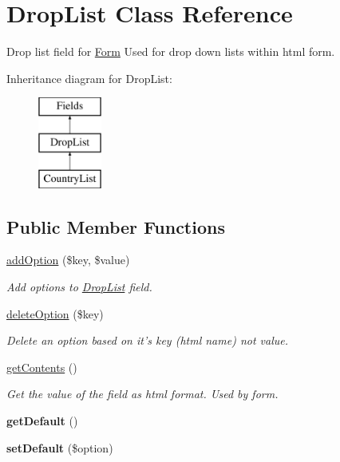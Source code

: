 \hypertarget{class_drop_list}{\section{Drop\-List Class Reference}
\label{class_drop_list}
}


Drop list field for \hyperlink{class_form}{Form} Used for drop down lists within html form.  


Inheritance diagram for Drop\-List\-:\begin{figure}[H]
\begin{center}
\leavevmode
\includegraphics[height=3.000000cm]{class_drop_list}
\end{center}
\end{figure}
\subsection*{Public Member Functions}
\begin{DoxyCompactItemize}
\item 
\hyperlink{class_drop_list_ae820b56637ba8a8d0c4de37d4313231a}{add\-Option} (\$key, \$value)
\begin{DoxyCompactList}\small\item\em Add options to \hyperlink{class_drop_list}{Drop\-List} field. \end{DoxyCompactList}\item 
\hypertarget{class_drop_list_a3c65f396966df9520cc32aceecdac142}{\hyperlink{class_drop_list_a3c65f396966df9520cc32aceecdac142}{delete\-Option} (\$key)}\label{class_drop_list_a3c65f396966df9520cc32aceecdac142}

\begin{DoxyCompactList}\small\item\em Delete an option based on it's key (html name) not value. \end{DoxyCompactList}\item 
\hypertarget{class_drop_list_a14814e04b348120748912692645f3a75}{\hyperlink{class_drop_list_a14814e04b348120748912692645f3a75}{get\-Contents} ()}\label{class_drop_list_a14814e04b348120748912692645f3a75}

\begin{DoxyCompactList}\small\item\em Get the value of the field as html format. Used by form. \end{DoxyCompactList}\item 
\hypertarget{class_drop_list_adc30a2a4d3e48cb6aee21562afbc4022}{{\bfseries get\-Default} ()}\label{class_drop_list_adc30a2a4d3e48cb6aee21562afbc4022}

\item 
\hypertarget{class_drop_list_a04fffd28e332264bc38d2d07332a0db3}{{\bfseries set\-Default} (\$option)}\label{class_drop_list_a04fffd28e332264bc38d2d07332a0db3}

\end{DoxyCompactItemize}
